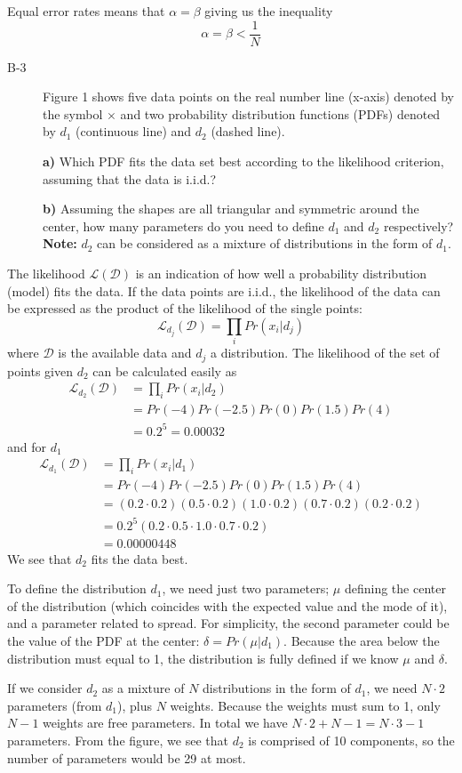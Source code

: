 \documentclass[10pt,a4paper]{article}
\newenvironment{prob}[1]%
   {%
    \begin{description}\item[#1]}%
   {\end{description}}
\begin{document}
Equal error rates means that $\alpha = \beta$ giving us the inequality
\begin{equation}
  \alpha = \beta < \frac{1}{N}
\end{equation}

\begin{prob}{B-3}
  Figure 1 shows five data points on the real number line (x-axis)
  denoted by the symbol $\times$ and two probability distribution
  functions (PDFs) denoted by $d_1$ (continuous line) and $d_2$
  (dashed line).

  \textbf{a)} Which PDF fits the data set best according to the
  likelihood criterion, assuming that the data is i.i.d.?

  \textbf{b)} Assuming the shapes are all triangular and symmetric
  around the center, how many parameters do you need to define $d_1$
  and $d_2$ respectively? \textbf{Note:} $d_2$ can be considered as a
  mixture of distributions in the form of $d_1$.
\end{prob}
The likelihood $\mathcal{L}(\mathcal{D})$ is an indication of how well
a probability distribution (model) fits the data. If the data points
are i.i.d., the likelihood of the data can be expressed as the product
of the likelihood of the single points:
\begin{equation}
  \mathcal{L}_{d_j}(\mathcal{D}) = \prod_iPr(x_i|d_j)
\end{equation}
where $\mathcal{D}$ is the available data and $d_j$ a
distribution. The likelihood of the set of points given $d_2$ can be
calculated easily as
\begin{align}
  \mathcal{L}_{d_2}(\mathcal{D}) &= \prod_iPr(x_i|d_2)\\
  &= Pr(-4)Pr(-2.5)Pr(0)Pr(1.5)Pr(4)\\
  &= 0.2^5 = 0.00032
\end{align}
and for $d_1$
\begin{align}
  \mathcal{L}_{d_1}(\mathcal{D}) &= \prod_iPr(x_i|d_1)\\
  &= Pr(-4)Pr(-2.5)Pr(0)Pr(1.5)Pr(4)\\
  &= (0.2\cdot0.2)(0.5\cdot0.2)(1.0\cdot0.2)(0.7\cdot0.2)(0.2\cdot0.2)\\
  &= 0.2^5(0.2\cdot0.5\cdot1.0\cdot0.7\cdot0.2)\\
  &= 0.00000448
\end{align}
We see that $d_2$ fits the data best.

To define the distribution $d_1$, we need just two parameters; $\mu$
defining the center of the distribution (which coincides with the
expected value and the mode of it), and a parameter related to
spread. For simplicity, the second parameter could be the value of the
PDF at the center: $\delta = Pr(\mu|d_1)$. Because the area below the
distribution must equal to 1, the distribution is fully defined if we
know $\mu$ and $\delta$.

If we consider $d_2$ as a mixture of $N$ distributions in the form of
$d_1$, we need $N\cdot2$ parameters (from $d_1$), plus $N$
weights. Because the weights must sum to 1, only $N - 1$ weights are
free parameters. In total we have $N\cdot2 + N - 1 = N\cdot3 - 1$
parameters. From the figure, we see that $d_2$ is comprised of 10
components, so the number of parameters would be 29 at most.
\end{document}
